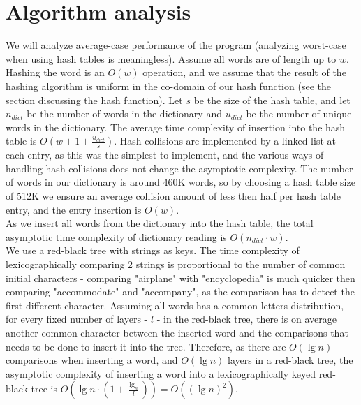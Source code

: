 \documentclass[a4paper]{article}
\begin{document}
\section{Algorithm analysis}

We will analyze average-case performance of the program (analyzing worst-case when using hash tables is meaningless). Assume all words are of length up to $w$. Hashing the word is an $O(w)$ operation, and we assume that the result of the hashing algorithm is uniform in the co-domain of our hash function (see the section discussing the hash function). Let $s$ be the size of the hash table, and let $n_{dict}$ be the number of words in the dictionary and $u_{dict}$ be the number of unique words in the dictionary. The average time complexity of insertion into the hash table is $O(w + 1 + \frac{u_{dict}}{s}) $. Hash collisions are implemented by a linked list at each entry, as this was the simplest to implement, and the various ways of handling hash collisions does not change the asymptotic complexity. The number of words in our dictionary is around 460K words, so by choosing a hash table size of 512K we ensure an average collision amount of less then half per hash table entry, and the entry insertion is $O(w)$.\\
As we insert all words from the dictionary into the hash table, the total asymptotic time complexity of dictionary reading is $O(n_{dict}\cdot w)$.\\

We use a red-black tree with strings as keys. The time complexity of lexicographically comparing 2 strings is proportional to the number of common initial characters - comparing "airplane" with "encyclopedia" is much quicker then comparing "accommodate" and "accompany", as the comparison has to detect the first different character. Assuming all words has a common letters distribution, for every fixed number of layers - $l$ - in the red-black tree, there is on average another common character between the inserted word and the comparisons that needs to be done to insert it into the tree. Therefore, as there are $O(\lg n)$ comparisons when inserting a word, and $O(\lg n)$ layers in a red-black tree, the asymptotic complexity of inserting a word into a lexicographically keyed red-black tree is $O(\lg n \cdot (1 + \frac{\lg_n}{l})) = O((\lg n)^2)$.\\
\end{document}
